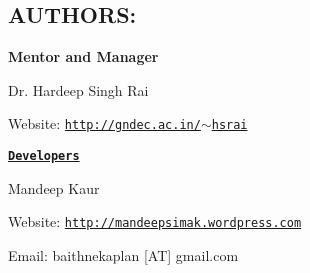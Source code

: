 \subsection*{A\-U\-T\-H\-O\-R\-S\-:}

{\bfseries Mentor and Manager}

Dr. Hardeep Singh Rai

Website\-: \href{http://gndec.ac.in/~hsrai}{\tt http\-://gndec.\-ac.\-in/$\sim$hsrai}

{\bfseries \href{https://github.com/GreatDevelopers/bakaplan/wiki/Contributors}{\tt Developers}}

Mandeep Kaur

Website\-: \href{http://mandeepsimak.wordpress.com}{\tt http\-://mandeepsimak.\-wordpress.\-com}

Email\-: baithnekaplan \mbox{[}A\-T\mbox{]} gmail.\-com 